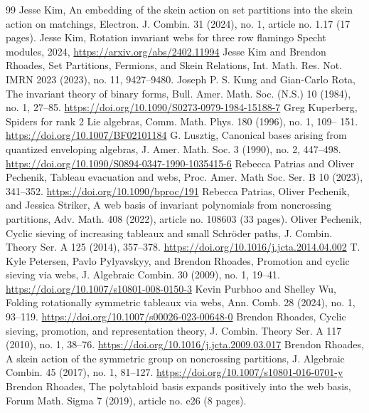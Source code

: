 \begin{thebibliography}{99}
 Jesse Kim, An embedding of the skein action on set partitions into the skein action on matchings, Electron. J. Combin. 31 (2024), no. 1, article no. 1.17 (17 pages). 
 Jesse Kim, Rotation invariant webs for three row flamingo Specht modules, 2024, \url{https://arxiv.org/abs/2402.11994}
 Jesse Kim and Brendon Rhoades, Set Partitions, Fermions, and Skein Relations, Int. Math. Res. Not. IMRN 2023 (2023), no. 11, 9427–9480. 
 Joseph P. S. Kung and Gian-Carlo Rota, The invariant theory of binary forms, Bull. Amer. Math. Soc. (N.S.) 10 (1984), no. 1, 27–85. \url{https://doi.org/10.1090/S0273-0979-1984-15188-7}
 Greg Kuperberg, Spiders for rank 2 Lie algebras, Comm. Math. Phys. 180 (1996), no. 1, 109– 151. \url{https://doi.org/10.1007/BF02101184}
 G. Lusztig, Canonical bases arising from quantized enveloping algebras, J. Amer. Math. Soc. 3 (1990), no. 2, 447–498. \url{https://doi.org/10.1090/S0894-0347-1990-1035415-6}
 Rebecca Patrias and Oliver Pechenik, Tableau evacuation and webs, Proc. Amer. Math Soc. Ser. B 10 (2023), 341–352. \url{https://doi.org/10.1090/bproc/191}
 Rebecca Patrias, Oliver Pechenik, and Jessica Striker, A web basis of invariant polynomials from noncrossing partitions, Adv. Math. 408 (2022), article no. 108603 (33 pages). 
 Oliver Pechenik, Cyclic sieving of increasing tableaux and small Schröder paths, J. Combin. Theory Ser. A 125 (2014), 357–378. \url{https://doi.org/10.1016/j.jcta.2014.04.002}
 T. Kyle Petersen, Pavlo Pylyavskyy, and Brendon Rhoades, Promotion and cyclic sieving via webs, J. Algebraic Combin. 30 (2009), no. 1, 19–41. \url{https://doi.org/10.1007/s10801-008-0150-3}
 Kevin Purbhoo and Shelley Wu, Folding rotationally symmetric tableaux via webs, Ann. Comb. 28 (2024), no. 1, 93–119. \url{https://doi.org/10.1007/s00026-023-00648-0}
 Brendon Rhoades, Cyclic sieving, promotion, and representation theory, J. Combin. Theory Ser. A 117 (2010), no. 1, 38–76. \url{https://doi.org/10.1016/j.jcta.2009.03.017}
 Brendon Rhoades, A skein action of the symmetric group on noncrossing partitions, J. Algebraic Combin. 45 (2017), no. 1, 81–127. \url{https://doi.org/10.1007/s10801-016-0701-y}
 Brendon Rhoades, The polytabloid basis expands positively into the web basis, Forum Math. Sigma 7 (2019), article no. e26 (8 pages). 

\end{thebibliography}
